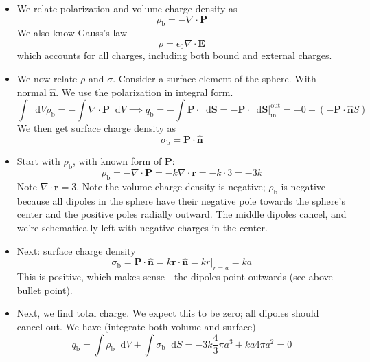 \documentclass[11pt, a4paper]{article}
\newcommand{\diff}{\mathop{}\!\mathrm{d}} %
\renewcommand{\vec}[1]{\bm{#1}} %
\newcommand{\uvec}[1]{\hat{\vec{#1}}} %
\renewcommand{\r}{\vec{r}}
\newcommand{\E}{\vec{E}}  %
\newcommand{\ee}{\epsilon_{0}}  %
\renewcommand{\P}{\vec{P}}  %
\renewcommand{\div}{\nabla \cdot}
\begin{document}
\begin{itemize}
	\item We relate polarization and volume charge density as
	\begin{equation*}
		\rho_{\text{b}} = - \div \P
	\end{equation*}
	We also know Gauss's law
	\begin{equation*}
		\rho = \ee \div \E
	\end{equation*}
	which accounts for all charges, including both bound and external charges. 
	
	\item We now relate $ \rho $ and $ \sigma $. Consider a surface element of the sphere. With normal $ \uvec{n} $. We use the polarization in integral form.
	\begin{equation*}
		\int \diff V \rho_{\text{b}} = - \int \div \P \diff V \implies q_{\text{b}} = - \int \P \cdot \diff \vec{S} = - \P \cdot \diff \vec{S} \big |_{\text{in}}^{\text{out}} = - 0 - (- \P \cdot \uvec{n}S)
	\end{equation*}
	We then get surface charge density as 
	\begin{equation*}
		\sigma_{\text{b}} = \P \cdot \uvec{n}
	\end{equation*}
	
	\item Start with $ \rho_{\text{b}} $, with known form of $ \P $:
	\begin{equation*}
		\rho_{\text{b}} = - \div \P = - k \div \r = - k \cdot 3 = - 3k
	\end{equation*}
	Note $ \div \r = 3 $. Note the volume charge density is negative; $ \rho_{\text{b}} $ is negative because all dipoles in the sphere have their negative pole towards the sphere's center and the positive poles radially outward. The middle dipoles cancel, and we're schematically left with negative charges in the center. 
	
	\item Next: surface charge density
	\begin{equation*}
		\sigma_{\text{b}} = \P \cdot \uvec{n} = k \r \cdot \uvec{n} = k r \big |_{r = a}  = k a
	\end{equation*}
	This is positive, which makes sense---the dipoles point outwards (see above bullet point).
	
	\item Next, we find total charge. We expect this to be zero; all dipoles should cancel out. We have (integrate both volume and surface)
	\begin{equation*}
		q_{\text{b}} = \int \rho_{\text{b}} \diff V + \int \sigma_{\text{b}} \diff S = - 3k \frac{4}{3}\pi a^{3} + ka 4\pi a^{2} = 0
	\end{equation*} 
	

\end{itemize}
\end{document}
